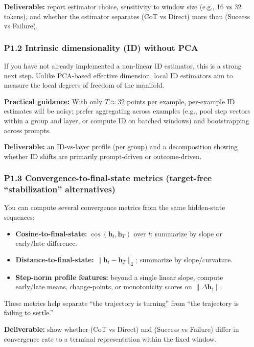 \textbf{Deliverable:} report estimator choice, sensitivity to window size (e.g., 16 vs 32 tokens), and whether the estimator separates (CoT vs Direct) more than (Success vs Failure).

\subsubsection{P1.2 Intrinsic dimensionality (ID) without PCA}

If you have not already implemented a non-linear ID estimator, this is a strong next step.
Unlike PCA-based effective dimension, local ID estimators aim to measure the local degrees of freedom of the manifold.

\textbf{Practical guidance:} With only $T\approx 32$ points per example, per-example ID estimates will be noisy; prefer aggregating across examples (e.g., pool step vectors within a group and layer, or compute ID on batched windows) and bootstrapping across prompts.

\textbf{Deliverable:} an ID-vs-layer profile (per group) and a decomposition showing whether ID shifts are primarily prompt-driven or outcome-driven.

\subsubsection{P1.3 Convergence-to-final-state metrics (target-free ``stabilization'' alternatives)}

You can compute several convergence metrics from the same hidden-state sequences:
\begin{itemize}[leftmargin=*]
\item \textbf{Cosine-to-final-state:} $\cos(\mathbf{h}_t, \mathbf{h}_T)$ over $t$; summarize by slope or early/late difference.
\item \textbf{Distance-to-final-state:} $\lVert \mathbf{h}_t - \mathbf{h}_T \rVert_2$; summarize by slope/curvature.
\item \textbf{Step-norm profile features:} beyond a single linear slope, compute early/late means, change-points, or monotonicity scores on $\lVert\Delta\mathbf{h}_t\rVert$.
\end{itemize}

These metrics help separate ``the trajectory is turning'' from ``the trajectory is failing to settle.''

\textbf{Deliverable:} show whether (CoT vs Direct) and (Success vs Failure) differ in convergence rate to a terminal representation within the fixed window.

